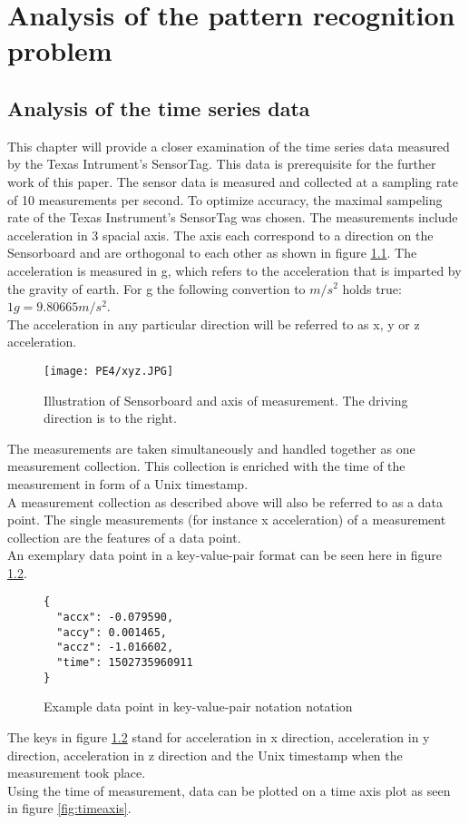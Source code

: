 \chapter{Analysis of the pattern recognition problem}
\label{ch:Analysis of the pattern recognition problem}

\section{Analysis of the time series data}
\label{sec:Analysis of the time series data}
This chapter will provide a closer examination of the time series data measured by the Texas Intrument's SensorTag. This data is prerequisite for the further work of this paper. \newline
The sensor data is measured and collected at a sampling rate of 10 measurements per second. To optimize accuracy, the maximal sampeling rate of the Texas Instrument's SensorTag was chosen.  The measurements include acceleration in 3 spacial axis. The axis each correspond to a direction on the Sensorboard and are orthogonal to each other as shown in figure \ref{fig:xyzboard}. The acceleration is measured in g, which refers to the acceleration that is imparted by the gravity of earth. For g the following convertion to  $m/s^2 $ holds true: $ 1 g = 9.80665 m/s^2 $. 
\\
The acceleration in any particular direction will be referred to as x, y or z acceleration.

\begin{figure}[h]
\centering
\texttt{[image: PE4/xyz.JPG]}
\caption{Illustration of Sensorboard and axis of measurement. The driving direction is to the right.}
\label{fig:xyzboard}
\end{figure}


The measurements are taken  simultaneously and handled together as one measurement collection. This collection is enriched with the time of the measurement  in form of a Unix timestamp.\\
A measurement collection as described above will also be referred to as a data point. The single measurements (for instance x acceleration) of a measurement collection are the features of a data point.\\
An exemplary data point in a key-value-pair format can be seen here in figure \ref{fig:datapointjson}.
\begin{figure}[h]
\centering
\begin{lstlisting}
{
  "accx": -0.079590,
  "accy": 0.001465,
  "accz": -1.016602,
  "time": 1502735960911
}
\end{lstlisting}
\caption{Example data point in key-value-pair notation notation}
\label{fig:datapointjson}
\end{figure}
The keys in figure \ref{fig:datapointjson} stand for acceleration in x direction, acceleration in y direction, acceleration in z direction and the Unix timestamp when the measurement took place. \\
Using the time of measurement, data can be plotted on a time axis plot as seen in figure \ref{fig:timeaxis}.


